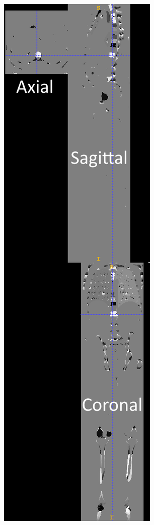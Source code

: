 \documentclass{InsightArticle}
\begin{document}
\begin{figure}
\includegraphics[scale=0.3]{wb-seg.png}

\end{figure}
\end{document}
